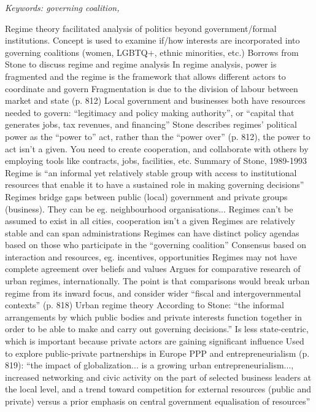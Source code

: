 \documentclass{article}
\begin{document}
\textit{Keywords: governing coalition, }

\begin{outline}
	\1 Regime theory facilitated analysis of politics beyond government/formal institutions. Concept is used to examine if/how interests are incorporated into governing coalitions (women, LGBTQ+, ethnic minorities, etc.)
	\1 Borrows from Stone to discuss regime and regime analysis 
	\1 In regime analysis, power is fragmented and the regime is the framework that allows different actors to coordinate and govern
		\2 Fragmentation is due to the division of labour between market and state (p. 812)
		\2 Local government and businesses both have resources needed to govern: ``legitimacy and policy making authority'', or ``capital that generates jobs, tax revenues, and financing''
	\1 Stone describes regimes' political power as the ``power to'' act, rather than the ``power over'' (p. 812), the power to act isn't a given. You need to create cooperation, and collaborate with others by employing tools like contracts, jobs, facilities, etc.
	\1 Summary of Stone, 1989-1993
		\2 Regime is ``an informal yet relatively stable group with access to institutional resources that enable it to have a sustained role in making governing decisions''
		\2 Regimes bridge gaps between public (local) government and private groups (business). They can be eg. neighbourhood organisations...
		\2 Regimes can't be assumed to exist in all cities, cooperation isn't a given
		\2 Regimes are relatively stable and can span administrations
		\2 Regimes can have distinct policy agendas based on those who participate in the ``governing coalition''
		\2 Consensus based on interaction and resources, eg. incentives, opportunities
		\2 Regimes may not have complete agreement over beliefs and values
	\1 Argues for comparative research of urban regimes, internationally. The point is that comparisons would break urban regime from its inward focus, and consider wider ``fiscal and intergovernmental contexts'' (p. 818)
	\1 Urban regime theory 
		\2 According to Stone: ``the informal arrangements by which public bodies and private interests function together in order to be able to make and carry out governing decisions.'' 
		\2 Is less state-centric, which is important because private actors are gaining significant influence
		\2 Used to explore public-private partnerships in Europe
	\1 PPP and entrepreneurialism (p. 819): ``the impact of globalization... is a growing urban entrepreneurialism..., increased networking and civic activity on the part of selected business leaders at the local level, and a trend toward competition for external resources (public and private) versus a prior emphasis on central government equalisation of resources''
\end{outline}
\end{document}
